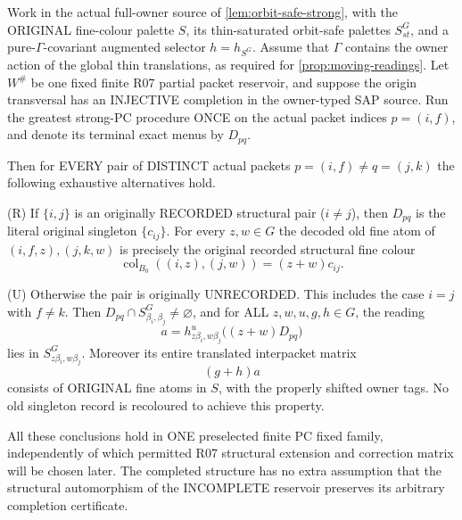 \begin{lemma}
\label{lem:orbit-safe-all-row-interface}
Work in the actual full-owner source of
\cref{lem:orbit-safe-strong}, with the ORIGINAL
fine-colour palette \(S\), its thin-saturated
orbit-safe palettes \(S^G_{st}\), and a
pure-\(\Gamma\)-covariant augmented selector
\(h=h_{S^G}\). Assume that \(\Gamma\) contains the
owner action of the global thin translations, as required for
\cref{prop:moving-readings}. Let \(W^\#\) be one fixed
finite R07 partial packet reservoir, and
suppose the origin transversal has an
INJECTIVE completion in the owner-typed
SAP source. Run the greatest strong-PC
procedure ONCE on the actual packet
indices \(p=(i,f)\), and denote its
terminal exact menus by \(D_{pq}\).

Then for EVERY pair of DISTINCT actual
packets \(p=(i,f)\ne q=(j,k)\)
the following exhaustive alternatives hold.

\smallskip
\noindent\textup{(R)} If \(\{i,j\}\) is an
originally RECORDED structural pair
(\(i\ne j\)), then \(D_{pq}\) is the
literal original singleton \( \{c_{ij}\}\).
For every \(z,w\in G\) the decoded
old fine atom of \((i,f,z),(j,k,w)\)
is precisely the original recorded
structural fine colour
\[
       \operatorname{col}_{B_0}((i,z),(j,w))
                          =(z+w)c_{ij}.
\]

\smallskip
\noindent\textup{(U)} Otherwise the pair
is originally UNRECORDED. This includes
the case \(i=j\) with \(f\ne k\).
Then \(D_{pq}\cap S^G_{\beta_i,\beta_j}
\ne\varnothing\), and for ALL
\(z,w,u,g,h\in G\), the reading
\[
 a=h^u_{z\beta_i,w\beta_j}
             \bigl((z+w)D_{pq}\bigr)
\]
lies in \(S^G_{z\beta_i,w\beta_j}\).
Moreover its entire translated
interpacket matrix
\[
             (g+h)a
\]
consists of ORIGINAL fine atoms in
\(S\), with the properly shifted owner
tags. No old singleton record is
recoloured to achieve this property.

All these conclusions hold in ONE
preselected finite PC fixed family,
independently of which permitted
R07 structural extension and correction
matrix will be chosen later.
The completed structure has no extra
assumption that the structural
automorphism of the INCOMPLETE
reservoir preserves its arbitrary
completion certificate.
\end{lemma}
